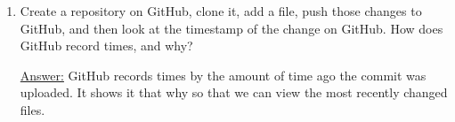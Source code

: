 \documentclass[12pt]{article}
\begin{document}
\begin{enumerate}
\item Create a repository on GitHub, clone it, add a file, push those changes to GitHub, and then look at the timestamp of the change on GitHub. How does GitHub record times, and why?
\begin{center}
\textsf{\underline{Answer:} GitHub records times by the amount of time ago the commit was uploaded. It shows it that why so that we can view the most recently changed files.}
\end{center}
\end{enumerate}
\end{document}
